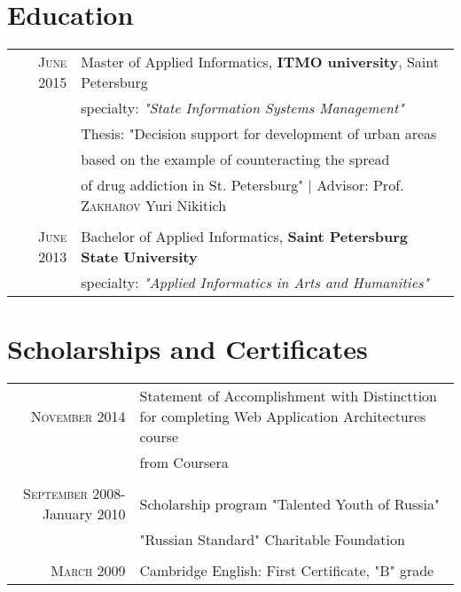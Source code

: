 \documentclass[a4paper,10pt]{article} %
\begin{document}
\section{Education}

\begin{tabular}{rl}	
    \textsc{June} 2015 & Master of Applied Informatics,
        \textbf{ITMO university}, Saint Petersburg\\
        & specialty: \small\emph{"State Information Systems Management"}
\medskip
\\
& Thesis: "Decision support for development of urban areas 
\\&
based on the example of counteracting the spread 
\\&
of drug addiction in St. Petersburg" | \small Advisor:  Prof.
\textsc{Zakharov} Yuri Nikitich
\\

\multicolumn{2}{c}{} \\

\textsc{June} 2013 & Bachelor of Applied Informatics,
\textbf{Saint Petersburg State University}\\
& specialty: \small\emph{"Applied Informatics in Arts and Humanities"}
\end{tabular}


\section{Scholarships and Certificates}

\begin{tabular}{rl}
    \textsc{November} 2014& Statement of Accomplishment with Distincttion for
    completing Web Application Architectures course
     \\&from Coursera\\
\multicolumn{2}{c}{} \\
    \textsc{September} 2008-January 2010& Scholarship program "Talented Youth of
Russia" \\&"Russian Standard" Charitable Foundation\\
\multicolumn{2}{c}{} \\
    \textsc{March} 2009& Cambridge English: First Certificate, "B" grade
\\
\end{tabular}
\end{document}

